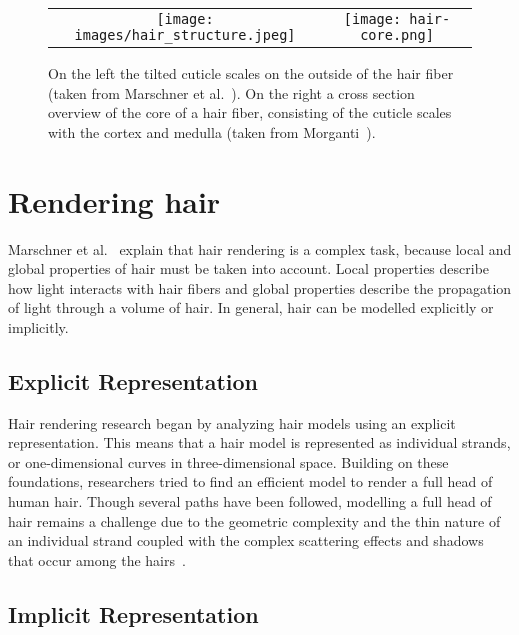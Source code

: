 \documentclass[11pt,a4paper]{report}
\begin{document}
\begin{figure}[h]
\begin{center}
\begin{tabular}{cc}
\texttt{[image: images/hair\_structure.jpeg]} & \texttt{[image: hair-core.png]} \\
\end{tabular}
\caption{On the left the tilted cuticle scales on the outside of the hair fiber (taken from Marschner et al.~\cite{marschner}). On the right a cross section overview of the core of a hair fiber, consisting of the cuticle scales with the cortex and medulla (taken from Morganti~\cite{morganti2015}).}
\label{fig_hair_structure}
\end{center}
\end{figure}


\section{Rendering hair}

Marschner et al.~\cite{marschner} explain that hair rendering is a complex task, because local and global properties of hair must be taken into account. Local properties describe how light interacts with hair fibers and global properties describe the propagation of light through a volume of hair. In general, hair can be modelled explicitly or implicitly.

\subsection{Explicit Representation}

Hair rendering research began by analyzing hair models using an explicit representation. This means that a hair model is represented as individual strands, or one-dimensional curves in three-dimensional space. Building on these foundations, researchers tried to find an efficient model to render a full head of human hair. Though several paths have been followed, modelling a full head of hair remains a challenge due to the geometric complexity and the thin nature of an individual strand coupled with the complex scattering effects and shadows that occur among the hairs~\cite{ward}.

\subsection{Implicit Representation}
\end{document}
